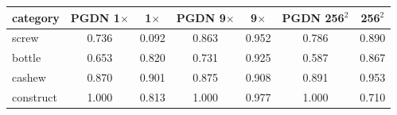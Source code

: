 \setlength{\tabcolsep}{3pt}
\begin{tabular}{@{}lcccccc@{}}
\toprule
category & PGDN 1$\times$ & \draem{} 1$\times$ & PGDN 9$\times$ & \draem{} 9$\times$ & PGDN 256$^2$ & \draem{} 256$^2$ \\
\midrule
screw & 0.736 & 0.092 & 0.863 & 0.952 & 0.786 & 0.890 \\
bottle & 0.653 & 0.820 & 0.731 & 0.925 & 0.587 & 0.867 \\
cashew & 0.870 & 0.901 & 0.875 & 0.908 & 0.891 & 0.953 \\
construct & 1.000 & 0.813 & 1.000 & 0.977 & 1.000 & 0.710 \\
\bottomrule
\end{tabular}
